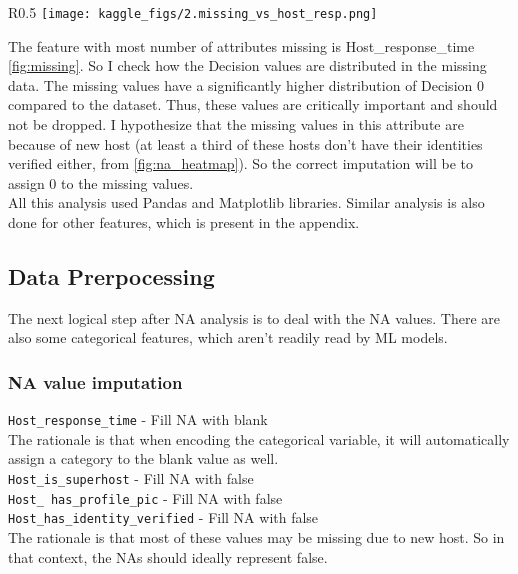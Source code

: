 \documentclass[12pt]{article}
\theoremstyle{definition}
\begin{document}
\begin{wrapfigure}{R}{0.5\textwidth}
\centering
\texttt{[image: kaggle\_figs/2.missing\_vs\_host\_resp.png]}
\caption{\label{fig:missing} What Decision values do rows with missing Host\_response\_time have? }
\end{wrapfigure}


The feature with most number of attributes missing is Host\_response\_time \ref{fig:missing}. So I check how the Decision values are distributed in the missing data. The missing values have a significantly higher distribution of Decision 0 compared to the dataset. Thus, these values are critically important and should not be dropped. I hypothesize that the missing values in this attribute are because of new host (at least a third of these hosts don't have their identities verified either, from \ref{fig:na_heatmap}). So the correct imputation will be to assign 0 to the missing values.\\

All this analysis used Pandas\cite{pandas} and Matplotlib\cite{matplotlib} libraries. Similar analysis is also done for other features, which is present in the appendix. 

\subsection{Data Prerpocessing}
The next logical step after NA analysis is to deal with the NA values. There are also some categorical features, which aren't readily read by ML models. 

\subsubsection{NA value imputation}
\texttt{Host\_response\_time} - Fill NA with blank\\
The rationale is that when encoding the categorical variable, it will automatically assign a category to the blank value as well.\\

\texttt{Host\_is\_superhost} - Fill NA with false\\
\texttt{Host\_ has\_profile\_pic} - Fill NA with false\\
\texttt{Host\_has\_identity\_verified} - Fill NA with false\\
The rationale is that most of these values may be missing due to new host. So in that context, the NAs should ideally represent false.\\
\end{document}
